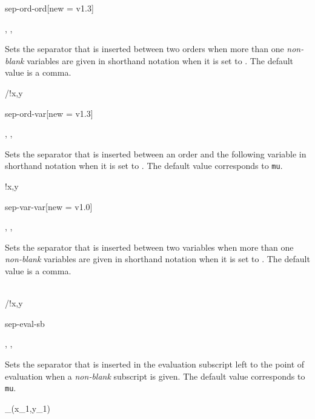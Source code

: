 \begin{option}{sep-ord-ord}[new = v1.3]
	\begin{values}[default = {{,}}]
		, , 
	\end{values}
	Sets the separator that is inserted between two orders when more than one \emph{non-blank} variables are given in shorthand notation when it is set to . The default value is a comma.
	\begin{example}
		/!{x,y}
	\end{example}
\end{option}

\begin{option}{sep-ord-var}[new = v1.3]
	\begin{values}[default = 0]
		, , \marg{delimiter}
	\end{values}
	Sets the separator that is inserted between an order and the following variable in shorthand notation when it is set to . The default value corresponds to  \texttt{mu}.
	\begin{example}
		!{x,y}
	\end{example}
\end{option}

\begin{option}{sep-var-var}[new = v1.0]
	\begin{values}[default = {{,}}]
		, , 
	\end{values}
	Sets the separator that is inserted between two variables when more than one \emph{non-blank} variables are given in shorthand notation when it is set to . The default value is a comma.
	\begin{example}
		\odv[sep-var-var=\here]{f}{x,y} \\
		/!{x,y}
	\end{example}
\end{option}

\clearpage

\begin{option}{sep-eval-sb}
	\begin{values}[default = 0]
		, , 
	\end{values}
	Sets the separator that is inserted in the evaluation subscript left to the point of evaluation when a \emph{non-blank} subscript is given. The default value corresponds to  \texttt{mu}.
	\begin{example}
		_{(x_1,y_1)}
	\end{example}
\end{option}

